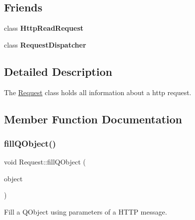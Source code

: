 \subsection*{Friends}
\begin{DoxyCompactItemize}
\item 
\mbox{\label{class_request_a4d54f5003e07e218070a449c22a52c7c}} 
class {\bfseries Http\+Read\+Request}
\item 
\mbox{\label{class_request_ae82f2dbbf52e70637edba766141fd80e}} 
class {\bfseries Request\+Dispatcher}
\end{DoxyCompactItemize}


\subsection{Detailed Description}
The \hyperlink{class_request}{Request} class holds all information about a http request. 

\subsection{Member Function Documentation}
\mbox{\label{class_request_a934d83fe6fe62aba36a625b6edad8d65}} 
\subsubsection{\texorpdfstring{fill\+Q\+Object()}{fillQObject()}}
{\footnotesize\ttfamily void Request\+::fill\+Q\+Object (\begin{DoxyParamCaption}\item[{Q\+Object $\ast$}]{object }\end{DoxyParamCaption})}



Fill a Q\+Object using parameters of a H\+T\+TP message. 


